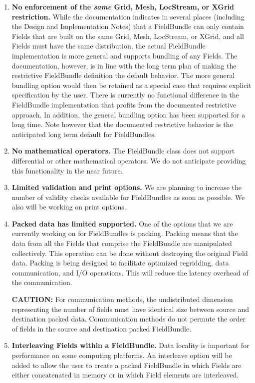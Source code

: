 
\label{sec:bundlerest}

\begin{enumerate}

\item{\bf No enforcement of the {\em same} Grid, Mesh, LocStream, or XGrid 
restriction.}
While the documentation indicates in several places (including the Design and
Implementation Notes) that a FieldBundle can only contain Fields that are built
on the same Grid, Mesh, LocStream, or XGrid, and all Fields must have the same
distribution, the actual FieldBundle implementation is more general and
supports bundling of any Fields. The documentation, however, is
in line with the long term plan of making the restrictive FieldBundle definition
the default behavior. The more general bundling option would then be retained
as a special case that requires explicit specification by the user.
There is currently no functional difference in the FieldBundle implementation
that profits from the documented restrictive approach. In addition, the general
bundling option has been supported for a long time. Note however that the
documented restrictive behavior is the anticipated long term default for
FieldBundles.

\item{\bf No mathematical operators.}
The FieldBundle class does not support differential or other
mathematical operators.  We do not anticipate providing this 
functionality in the near future.

\item{\bf Limited validation and print options.}
We are planning to increase the number of validity checks available
for FieldBundles as soon as possible.  We also will
be working on print options.

\item{\bf Packed data has limited supported.}
One of the options that we are currently working on for FieldBundles is
packing.  Packing means that the data from all the
Fields that comprise the FieldBundle are manipulated collectively.
This operation can be done without 
destroying the original Field data.  Packing is being designed to 
facilitate optimized regridding, data communication, and I/O operations.
This will reduce the latency overhead of the communication.  

{\bf CAUTION:} For communication methods, the undistributed dimension representing
the number of fields must have identical size between source and destination packed
data. Communication methods do not permute the order of fields in the source
and destination packed FieldBundle.

\item{\bf Interleaving Fields within a FieldBundle.}
Data locality is important for performance on some computing
platforms.  An interleave option will be added to allow the user to create
a packed FieldBundle in which Fields are either concatenated in memory
or in which Field elements are interleaved.

\end{enumerate}




